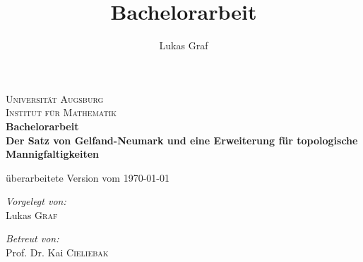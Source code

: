 \documentclass[a4paper,ngerman,bibtotoc]{scrartcl}
\title{Bachelorarbeit}
\author{Lukas Graf}
\theoremstyle{definition}
\theoremstyle{plain}
\theoremstyle{remark}
\begin{document}
\begin{titlepage}\center
\textsc{\LARGE Universität Augsburg}\\[1.5cm]

\textsc{\Large Institut für Mathematik}\\[2.5cm]

{ \huge \bfseries Bachelorarbeit \\[1.5cm]
\Large Der Satz von Gelfand-Neumark und eine Erweiterung für topologische Mannigfaltigkeiten \\[1.5cm]}

überarbeitete Version vom \today

\vfill

\begin{minipage}{0.4\textwidth}
\begin{flushleft} \large
\emph{Vorgelegt von:}\\
 Lukas \textsc{Graf}
\end{flushleft}
\end{minipage}
\begin{minipage}{0.4\textwidth}
\begin{flushright} \large
\emph{Betreut von:} \\
 Prof. Dr. Kai \textsc{Cieliebak}
\end{flushright}
\end{minipage}

\end{titlepage}


\tableofcontents

\newpage


\newpage

\newpage

\newpage

\newpage


\newpage



\newpage
\nocite{*}
\printbibliography
\end{document}
